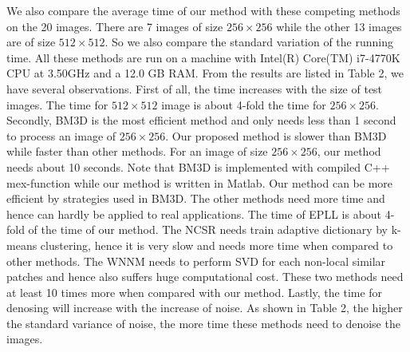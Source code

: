 \documentclass[10pt,twocolumn,letterpaper]{article}
\begin{document}
We also compare the average time of our method with these competing methods on the 20 images. There are 7 images of size $256\times256$ while the other 13 images are of size $512\times512$. So we also compare the standard variation of the running time. All these methods are run on a machine with Intel(R) Core(TM) i7-4770K CPU at 3.50GHz and a 12.0 GB RAM. From the results are listed in Table 2, we have several observations. First of all, the time increases with the size of test images. The time for $512\times512$ image is about 4-fold the time for $256\times256$. Secondly, BM3D is the most efficient method and only needs less than 1 second to process an image of $256\times256$. Our proposed method is slower than BM3D while faster than other methods. For an image of size $256\times256$, our method needs about 10 seconds. Note that BM3D is implemented with compiled C++ mex-function while our method is written in Matlab. Our method can be more efficient by strategies used in BM3D. The other methods need more time and hence can hardly be applied to real applications. The time of EPLL is about 4-fold of the time of our method. The NCSR needs train adaptive dictionary by k-means clustering, hence it is very slow and needs more time when compared to other methods. The WNNM\cite{wnnm} needs to perform SVD for each non-local similar patches and hence also suffers huge computational cost. These two methods need at least 10 times more when compared with our method. Lastly, the time for denosing will increase with the increase of noise. As shown in Table 2, the higher the standard variance of noise, the more time these methods need to denoise the images.
\end{document}
